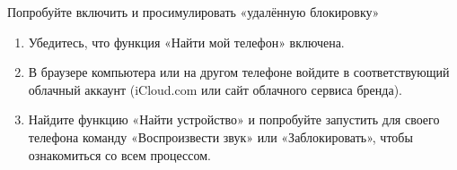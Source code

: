 \begin{tcbpractice}{Попробуйте включить и просимулировать «удалённую блокировку»}
\begin{enumerate}
  \item Убедитесь, что функция «Найти мой телефон» включена.
  \item В браузере компьютера или на другом телефоне войдите в соответствующий облачный аккаунт (iCloud.com или сайт облачного сервиса бренда).
  \item Найдите функцию «Найти устройство» и попробуйте запустить для своего телефона команду «Воспроизвести звук» или «Заблокировать», чтобы ознакомиться со всем процессом.
\end{enumerate}

\end{tcbpractice}
